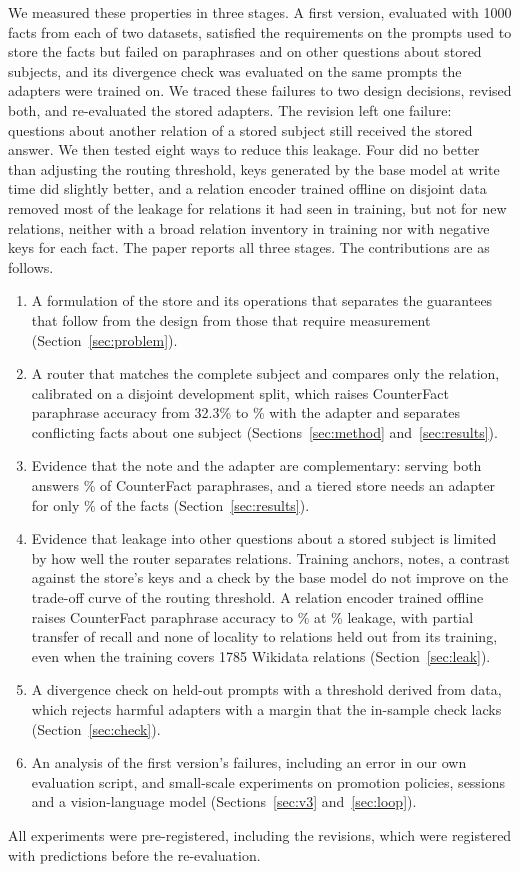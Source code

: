 \documentclass[journal,10pt]{IEEEtran}
\begin{document}
We measured these properties in three stages. A first version, evaluated with 1000
facts from each of two datasets, satisfied the requirements on the prompts used to store
the facts but failed on paraphrases and on other questions about stored subjects, and its
divergence check was evaluated on the same prompts the adapters were trained on. We traced
these failures to two design decisions, revised both, and re-evaluated the stored
adapters. The revision left one failure: questions about another relation of a stored
subject still received the stored answer. We then tested eight ways to reduce this
leakage. Four did no better than adjusting the routing threshold, keys generated by the
base model at write time did slightly better, and a relation encoder trained offline on
disjoint data removed most of the leakage for relations it had seen in training, but not
for new relations, neither with a broad relation inventory in training nor with negative
keys for each fact. The paper reports all three stages. The contributions are as follows.
\begin{enumerate}
\item A formulation of the store and its operations that separates the guarantees that
follow from the design from those that require measurement (Section~\ref{sec:problem}).
\item A router that matches the complete subject and compares only the relation,
calibrated on a disjoint development split, which raises CounterFact paraphrase
accuracy from 32.3\% to \vCfParaPct\% with the adapter and separates conflicting facts
about one subject (Sections~\ref{sec:method} and~\ref{sec:results}).
\item Evidence that the note and the adapter are complementary: serving both answers
\vCfParaBothPct\% of CounterFact paraphrases, and a tiered store needs an adapter for only
\vCfTierFracPct\% of the facts (Section~\ref{sec:results}).
\item Evidence that leakage into other questions about a stored subject is limited by how
well the router separates relations. Training anchors, notes, a contrast against the
store's keys and a check by the base model do not improve on the trade-off curve of the
routing threshold. A relation encoder trained offline raises CounterFact paraphrase
accuracy to \xCfParaBothPct\% at \xCfEthreeLeakBothPct\% leakage, with partial transfer
of recall and none of locality to relations held out from its training, even when the
training covers 1785 Wikidata relations (Section~\ref{sec:leak}).
\item A divergence check on held-out prompts with a threshold derived from data, which
rejects harmful adapters with a margin that the in-sample check lacks
(Section~\ref{sec:check}).
\item An analysis of the first version's failures, including an error in our own
evaluation script, and small-scale experiments on promotion policies, sessions and a
vision-language model (Sections~\ref{sec:v3} and~\ref{sec:loop}).
\end{enumerate}
All experiments were pre-registered, including the revisions, which were registered
with predictions before the re-evaluation.
\end{document}
